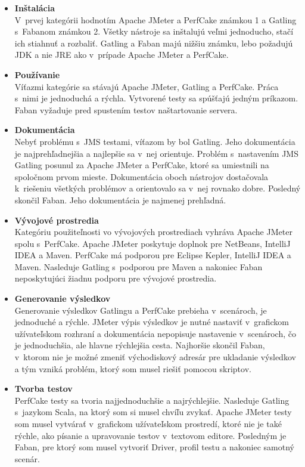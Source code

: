 \documentclass[12pt,oneside,final]{fithesis-utf8}
\begin{document}
\begin{itemize}

\item \textbf{Inštalácia}\\
V~prvej kategórii hodnotím Apache JMeter a PerfCake známkou 1 a Gatling s~Fabanom známkou 2. Všetky nástroje sa inštalujú veľmi jednoducho, stačí ich stiahnuť a rozbaliť. Gatling a Faban majú nižšiu známku, lebo požadujú JDK a nie JRE ako v~prípade Apache JMeter a PerfCake.

\item \textbf{Používanie}\\
Víťazmi kategórie sa stávajú Apache JMeter, Gatling a PerfCake. Práca s~nimi je jednoduchá a rýchla. Vytvorené testy sa spúšťajú jedným príkazom. Faban vyžaduje pred spustením testov naštartovanie servera.

\item \textbf{Dokumentácia}\\
Nebyť problému s~JMS testami, víťazom by bol Gatling. Jeho dokumentácia je najprehľadnejšia a najlepšie sa v~nej orientuje. Problém s~nastavením JMS Gatling posunul za Apache JMeter a PerfCake, ktoré sa umiestnili na spoločnom prvom mieste. Dokumentácia oboch nástrojov dostačovala k~riešeniu všetkých problémov a orientovalo sa v~nej rovnako dobre. Posledný skončil Faban. Jeho dokumentácia je najmenej prehľadná. 

\item \textbf{Vývojové prostredia}\\
Kategóriu použiteľnosti vo vývojových prostrediach vyhráva Apache JMeter spolu s~PerfCake. Apache JMeter poskytuje doplnok pre NetBeans, IntelliJ IDEA a Maven. PerfCake má podporou pre Eclipse Kepler, IntelliJ IDEA a Maven. Nasleduje Gatling s~podporou pre Maven a nakoniec Faban neposkytujúci žiadnu podporu pre vývojové prostredia.

\item \textbf{Generovanie výsledkov}\\
Generovanie výsledkov Gatlingu a PerfCake prebieha v~scenároch, je jednoduché a rýchle. JMeter výpis výsledkov je nutné nastaviť v~grafickom užívateľskom rozhraní a dokumentácia nepopisuje nastavenie v~scenároch, čo je jednoduchšia, ale hlavne rýchlejšia cesta. Najhoršie skončil Faban, v~ktorom nie je možné zmeniť východiskový adresár pre ukladanie výsledkov a tým vzniká problém, ktorý som musel riešiť pomocou skriptov.

\item \textbf{Tvorba testov}\\
PerfCake testy sa tvoria najjednoduchšie a najrýchlejšie. Nasleduje Gatling s~jazykom Scala, na ktorý som si musel chvíľu zvykať. Apache JMeter testy som musel vytvárať v~grafickom užívateľskom prostredí, ktoré nie je také rýchle, ako písanie a upravovanie testov v~textovom editore. Posledným je Faban, pre ktorý som musel vytvoriť Driver, profil testu a nakoniec samotný scenár.


\end{itemize}
\end{document}
